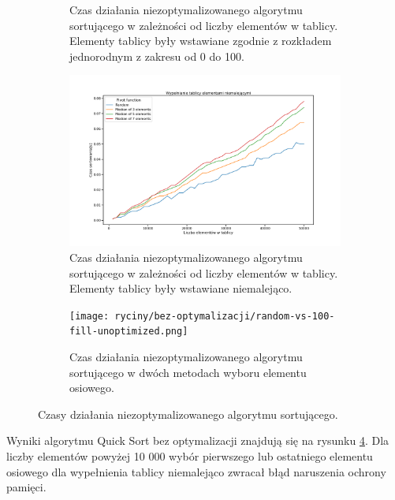 \documentclass{article}
\begin{document}
\begin{figure}
\begin{subfigure}[t]{0.47\textwidth}
            \caption{Czas działania niezoptymalizowanego algorytmu sortującego w zależności od liczby elementów w tablicy. Elementy tablicy były wstawiane zgodnie z rozkładem jednorodnym z zakresu od 0 do 100.}
            \label{fig:unoptimized:100_fill}
        \end{subfigure}
        \newline
        \begin{subfigure}[t]{0.47\textwidth}
            \centering
            \includegraphics[width=\linewidth]{ryciny/bez-optymalizacji/lineplot-nondecreasing-fill-unoptimized.png}
            \caption{Czas działania niezoptymalizowanego algorytmu sortującego w zależności od liczby elementów w tablicy. Elementy tablicy były wstawiane niemalejąco.}
            \label{fig:unoptimized:nondecreasing_fill}
        \end{subfigure}
        \hfill
        \begin{subfigure}[t]{0.47\textwidth}
            \centering
            \texttt{[image: ryciny/bez-optymalizacji/random-vs-100-fill-unoptimized.png]}
            \caption{Czas działania niezoptymalizowanego algorytmu sortującego w dwóch metodach wyboru elementu osiowego.}
            \label{fig:unoptimized:rand-vs-100}
        \end{subfigure}
        \caption{Czasy działania niezoptymalizowanego algorytmu sortującego.}
        \label{fig:unoptimized}
    \end{figure}
    Wyniki algorytmu Quick Sort bez optymalizacji znajdują się na rysunku \ref{fig:unoptimized}. Dla liczby elementów powyżej 10 000 wybór pierwszego lub ostatniego elementu osiowego dla wypełnienia tablicy niemalejąco zwracał błąd naruszenia ochrony pamięci.
\end{document}
